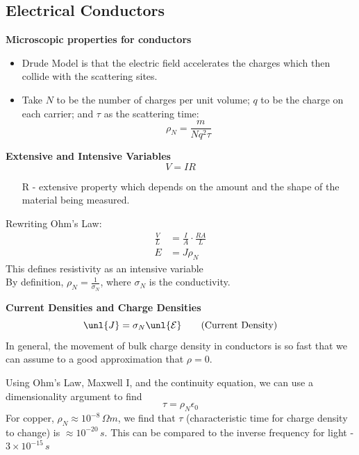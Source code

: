 \documentclass[a4paper, 11pt, normalem]{report}
\renewcommand\E{\mathcal{E}}
\newcommand\uE{\unl{\E}}
\newcommand\eno{\epsilon_0}
\newcommand\J{\unl{J}}
\begin{document}
\subsection{Electrical Conductors}
\textbf{Microscopic properties for conductors}
\begin{itemize}
    \item Drude Model is that the electric field accelerates the charges which then collide with the scattering sites.
    \item Take $N$ to be the number of charges per unit volume; $q$ to be the charge on each carrier; and $\tau$ as the scattering time:
    \begin{equation}
        \rho_N = \frac{m}{Nq^2\tau}
    \end{equation}
\end{itemize}

\textbf{Extensive and Intensive Variables}
\begin{equation}
    V = IR \tag{Ohm's Law}
\end{equation}
\begin{itemize}
    \item[R] - extensive property which depends on the amount and the shape of the material being measured.
\end{itemize}
Rewriting Ohm's Law:
\begin{align}
    \frac{V}{L} &= \frac{I}{A} \cdot \frac{RA}{L} \\
    E &= J \rho_N
\end{align}
This defines resistivity as an intensive variable \\
By definition, $\rho_N = \frac{1}{\sigma_N}$, where $\sigma_N$ is the conductivity.

\textbf{Current Densities and Charge Densities}
\begin{equation}
    \J = \sigma_N \uE \tag{Current Density}
\end{equation}
In general, the movement of bulk charge density in conductors is so fast that we can assume to a good approximation that $\rho = 0.$

Using Ohm's Law, Maxwell \RN{1}, and the continuity equation, we can use a dimensionality argument to find
\begin{equation}
    \tau = \rho_N\eno
\end{equation}
For copper, $\rho_N \approx 10^{-8}\,\Omega m$, we find that $\tau$ (characteristic time for charge density to change) is $\approx 10^{-20}\,s$.
This can be compared to the inverse frequency for light - $3\times10^{-15}\,s$
\end{document}
